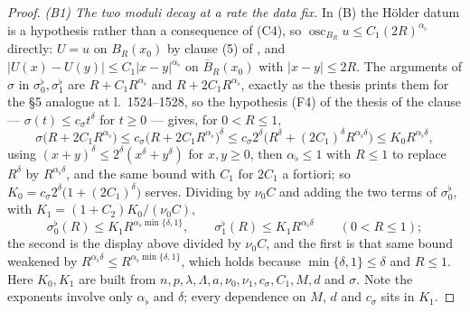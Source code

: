 \begin{proof}
\emph{(B1) The two moduli decay at a rate the data fix.}  In (B) the H\"older
datum is a hypothesis rather than a consequence of (C4), so
$\operatorname*{osc}_{B_R}u\le C_1(2R)^{\alpha_\flat}$ directly: $U=u$ on
$B_R(x_0)$ by clause (5) of , and
$|U(x)-U(y)|\le C_1|x-y|^{\alpha_\flat}$ on $\overline B_R(x_0)$ with
$|x-y|\le2R$.  The arguments of $\sigma$ in $\sigma_0^{\flat},\sigma_1^{\flat}$
are $R+C_1R^{\alpha_\flat}$ and $R+2C_1R^{\alpha_\flat}$, exactly as the thesis
prints them for the \S5 analogue at l.~1524--1528, so the hypothesis
(F4) of the thesis of the clause --- $\sigma(t)\le c_\sigma t^{\delta}$ for $t\ge0$
--- gives, for $0<R\le1$,
\[
\sigma\bigl(R+2C_1R^{\alpha_\flat}\bigr)
\le c_\sigma\bigl(R+2C_1R^{\alpha_\flat}\bigr)^{\delta}
\le c_\sigma2^{\delta}\bigl(R^{\delta}
+(2C_1)^{\delta}R^{\alpha_\flat\delta}\bigr)
\le K_0R^{\alpha_\flat\delta} ,
\]
using $(x+y)^{\delta}\le2^{\delta}(x^{\delta}+y^{\delta})$ for $x,y\ge0$, then
$\alpha_\flat\le1$ with $R\le1$ to replace $R^{\delta}$ by
$R^{\alpha_\flat\delta}$, and the same bound with $C_1$ for $2C_1$ a fortiori;
so $K_0=c_\sigma2^{\delta}\bigl(1+(2C_1)^{\delta}\bigr)$ serves.  Dividing by
$\nu_0C$ and adding the two terms of $\sigma_0^{\flat}$, with
$K_1=(1+C_2)K_0/(\nu_0C)$,
\[
\sigma_0^{\flat}(R)\le K_1R^{\alpha_\flat\min\{\delta,1\}},
\qquad
\sigma_1^{\flat}(R)\le K_1R^{\alpha_\flat\delta}
\qquad(0<R\le1) ;
\]
the second is the display above divided by $\nu_0C$, and the first is that same
bound weakened by $R^{\alpha_\flat\delta}\le R^{\alpha_\flat\min\{\delta,1\}}$,
which holds because $\min\{\delta,1\}\le\delta$ and $R\le1$.  Here $K_0,K_1$ are
built from
$n,p,\lambda,\Lambda,a,\nu_0,\nu_1,c_\sigma,C_1,M,d$ and $\sigma$.  Note the
exponents involve only $\alpha_\flat$ and $\delta$; every dependence on $M$, $d$
and $c_\sigma$ sits in $K_1$.


\end{proof}
